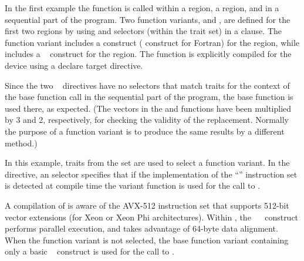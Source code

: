 In the first example the  function is called within a  region,
a  region, and in a sequential part of the program.  Two function variants,  and ,
are defined for the first two regions by using  and  selectors (within
the  trait set) in a  clause.  The  function variant includes
a  construct ( construct for Fortran) for the  region, 
while  includes a ~ construct for the  region.
The  function is explicitly compiled for the device using a declare target directive.

Since the two ~ directives have no selectors that match traits for the context
of the base function call in the sequential part of the program, the base  function is used there, 
as expected.
(The vectors in the  and  functions have been multiplied
by 3 and 2, respectively, for checking the validity of the replacement. Normally
the purpose of a function variant is to produce the same results by a different method.)


{}




In this example, traits from the  set are used to select a function variant.
In the ~ directive, an  selector
specifies that if the implementation of the ``'' 
instruction set is detected at compile time the 
variant function is used for the call to .  

A compilation of  is aware of
the AVX-512 instruction set that supports 512-bit vector extensions (for Xeon or Xeon Phi architectures). 
Within , the ~~ construct performs parallel execution, and
takes advantage of 64-byte data alignment. 
When the  function variant is not selected, the base  function variant
containing only a basic ~ construct is used for the call to .


{}

